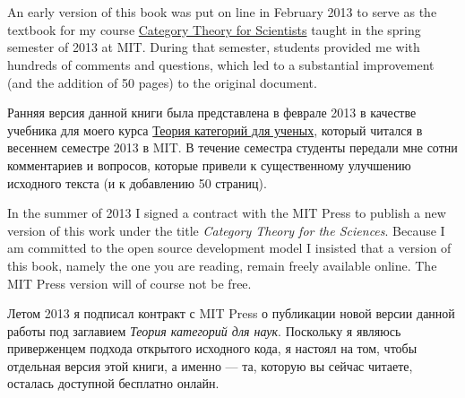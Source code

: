 
\chapter{}

\begin{blockENG}
An early version of this book was put on line in February 2013 to serve as the textbook for my course \href{http://math.mit.edu/~dspivak/teaching/sp13/}{\text Category Theory for Scientists} taught in the spring semester of 2013 at MIT. During that semester, students provided me with hundreds of comments and questions, which led to a substantial improvement (and the addition of 50 pages) to the original document.
\end{blockENG}

\begin{blockRUS}
Ранняя версия данной книги была представлена в феврале 2013 в качестве учебника для моего курса \href{http://math.mit.edu/~dspivak/teaching/sp13/}{\text Теория категорий для ученых},%
 который читался в весеннем семестре 2013 в MIT. В течение семестра студенты передали мне сотни комментариев и вопросов, которые привели к существенному улучшению исходного текста (и к добавлению 50 страниц).
\end{blockRUS}

\begin{blockENG}
In the summer of 2013 I signed a contract with the MIT Press to publish a new version of this work under the title {\em Category Theory for the Sciences}. Because I am committed to the open source development model I insisted that a version of this book, namely the one you are reading, remain freely available online. The MIT Press version will of course not be free.
\end{blockENG}

\begin{blockRUS}
Летом 2013 я подписал контракт с MIT Press о публикации новой версии данной работы под заглавием {\em Теория категорий для наук}. Поскольку я являюсь приверженцем подхода открытого исходного кода, я настоял на том, чтобы отдельная версия этой книги, а именно — та, которую вы сейчас читаете, осталась доступной бесплатно онлайн.%
\end{blockRUS}

